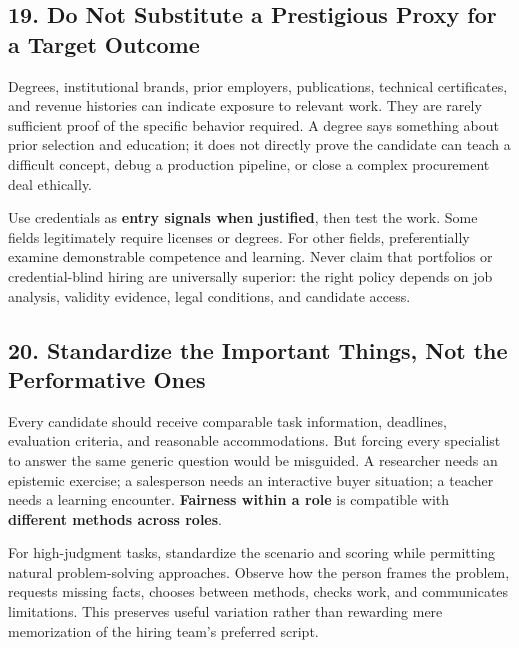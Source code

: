 \subsection*{19. Do Not Substitute a Prestigious Proxy for a Target Outcome}

Degrees, institutional brands, prior employers, publications, technical certificates, and revenue histories can indicate exposure to relevant work. They are rarely sufficient proof of the specific behavior required. A degree says something about prior selection and education; it does not directly prove the candidate can teach a difficult concept, debug a production pipeline, or close a complex procurement deal ethically.

Use credentials as \textbf{entry signals when justified}, then test the work. Some fields legitimately require licenses or degrees. For other fields, preferentially examine demonstrable competence and learning. Never claim that portfolios or credential-blind hiring are universally superior: the right policy depends on job analysis, validity evidence, legal conditions, and candidate access.

\subsection*{20. Standardize the Important Things, Not the Performative Ones}

Every candidate should receive comparable task information, deadlines, evaluation criteria, and reasonable accommodations. But forcing every specialist to answer the same generic question would be misguided. A researcher needs an epistemic exercise; a salesperson needs an interactive buyer situation; a teacher needs a learning encounter. \textbf{Fairness within a role} is compatible with \textbf{different methods across roles}.

For high-judgment tasks, standardize the scenario and scoring while permitting natural problem-solving approaches. Observe how the person frames the problem, requests missing facts, chooses between methods, checks work, and communicates limitations. This preserves useful variation rather than rewarding mere memorization of the hiring team's preferred script.

